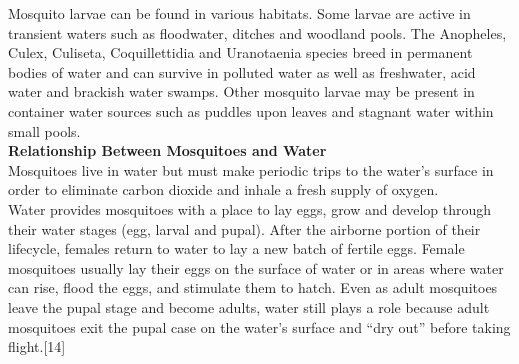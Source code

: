 \documentclass[11pt]{exam}
\begin{document}
\begin{questions}
Mosquito larvae can be found in various habitats. Some larvae are active in transient waters such as floodwater, ditches and woodland pools. The Anopheles, Culex, Culiseta, Coquillettidia and Uranotaenia species breed in permanent bodies of water and can survive in polluted water as well as freshwater, acid water and brackish water swamps. Other mosquito larvae may be present in container water sources such as puddles upon leaves and stagnant water within small pools.\\

\textbf{Relationship Between Mosquitoes and Water} \\
Mosquitoes live in water but must make periodic trips to the water’s surface in order to eliminate carbon dioxide and inhale a fresh supply of oxygen. \\

Water provides mosquitoes with a place to lay eggs, grow and develop through their water stages (egg, larval and pupal). After the airborne portion of their lifecycle, females return to water to lay a new batch of fertile eggs. Female mosquitoes usually lay their eggs on the surface of water or in areas where water can rise, flood the eggs, and stimulate them to hatch. Even as adult mosquitoes leave the pupal stage and become adults, water still plays a role because adult mosquitoes exit the pupal case on the water’s surface and “dry out” before taking flight.[14] \\



\end{questions}
\end{document}
